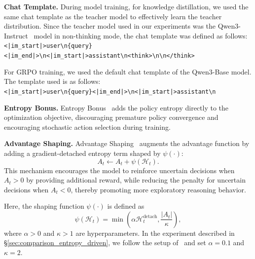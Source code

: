 \textbf{Chat Template.} During model training, for knowledge distillation, we used the same chat template as the teacher model to effectively learn the teacher distribution. Since the teacher model used in our experiments was the Qwen3-Instruct~\cite{yang2025qwen3} model in non-thinking mode, the chat template was defined as follows:\\ \texttt{<|im\_start|>user\textbackslash n\{query\}<|im\_end|>\textbackslash n<|im\_start|>assistant\textbackslash n<think>\textbackslash n\textbackslash n</think>}

For GRPO training, we used the default chat template of the Qwen3-Base model. The template used is as follows:\\\texttt{<|im\_start|>user\textbackslash n\{query\}<|im\_end|>\textbackslash n<|im\_start|>assistant\textbackslash n}


\textbf{Entropy Bonus.} Entropy Bonus~\cite{schulman2017proximal} adds the policy entropy directly to the optimization objective, discouraging premature policy convergence and encouraging stochastic action selection during training.

\textbf{Advantage Shaping.} Advantage Shaping~\cite{cheng2025reasoning} augments the advantage function by adding a gradient-detached entropy term shaped by $\psi(\cdot)$:
\[
A_t \leftarrow A_t + \psi(\mathcal{H}_t).
\]
This mechanism encourages the model to reinforce uncertain decisions when $A_t > 0$ by providing additional reward, while reducing the penalty for uncertain decisions when $A_t < 0$, thereby promoting more exploratory reasoning behavior.

Here, the shaping function $\psi(\cdot)$ is defined as
\begin{equation}
    \psi\left(\mathcal{H}_t\right) = \min \left(\alpha \mathcal{H}_t^{\text{detach}}, \dfrac{|A_t|}{\kappa}\right),
\end{equation}
where $\alpha > 0$ and $\kappa > 1$ are hyperparameters. In the experiment described in \S\ref{sec:comparison_entropy_driven}, we follow the setup of~\cite{cheng2025reasoning} and set $\alpha = 0.1$ and $\kappa = 2$.

